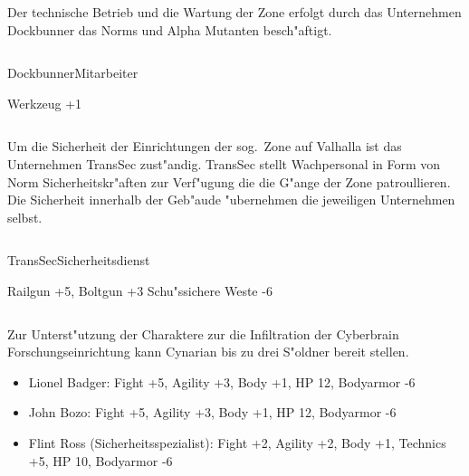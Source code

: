 
\begin{column}[l]{0.45}
    Der technische Betrieb und die Wartung der Zone erfolgt durch das Unternehmen Dockbunner das Norms und Alpha Mutanten 
    besch"aftigt.
\end{column}
\begin{column}[r]{0.45}
    \begin{nscsheet}[h]{Dockbunner\newline{}Mitarbeiter}
        \nscstats[ATT=2,AGG=2,EMP=3,KNO=5,HP=10]
        \nscruler
        \begin{nscinventory}
            \nscitem[Waffen] Werkzeug +1
        \end{nscinventory}
    \end{nscsheet}
\end{column}    


\begin{column}[l]{0.45}
    Um die Sicherheit der Einrichtungen der sog.~Zone auf Valhalla ist das Unternehmen TransSec zust"andig. TransSec stellt
    Wachpersonal in Form von Norm Sicherheitskr"aften zur Verf"ugung die die G"ange der Zone patroullieren. Die Sicherheit
    innerhalb der Geb"aude "ubernehmen die jeweiligen Unternehmen selbst.
\end{column}
\begin{column}[r]{0.45}
    \begin{nscsheet}[h]{TransSec\newline{}Sicherheitsdienst}
        \nscstats[ATT=3,AGG=3,EMP=2,KNO=4,HP=10]
        \nscruler
        \begin{nscinventory}
            \nscitem[Waffen] Railgun +5, Boltgun +3
            \nscitem[R"ustung] Schu"ssichere Weste -6           
        \end{nscinventory}
    \end{nscsheet}
\end{column}        


Zur Unterst"utzung der Charaktere zur die Infiltration der Cyberbrain Forschungseinrichtung kann Cynarian bis zu 
drei S"oldner bereit stellen.

\begin{itemize}
    \item Lionel Badger: Fight +5, Agility +3, Body +1, HP 12, Bodyarmor -6
    \item John Bozo: Fight +5, Agility +3, Body +1, HP 12, Bodyarmor -6
    \item Flint Ross (Sicherheitsspezialist): Fight +2, Agility +2, Body +1, Technics +5, HP 10, Bodyarmor -6
\end{itemize}

